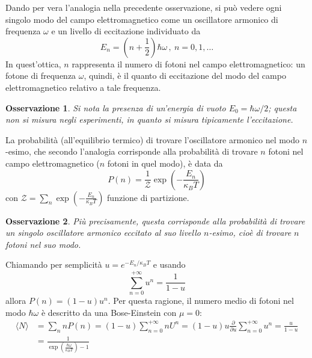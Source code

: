 \documentclass[11pt, a4paper]{scrartcl}
\theoremstyle{style}
\newtheorem{osservazione}{Osservazione}[section]
\numberwithin{equation}{subsection}
\begin{document}
\noindent Dando per vera l'analogia nella precedente osservazione, si pu\`o vedere ogni singolo modo del campo elettromagnetico come un oscillatore armonico di frequenza $ \omega$ e un livello di eccitazione individuato da 
\[
E_n = \left(n + \frac{1}{2}\right) \hbar \omega \, , \ n = 0,1 , \ldots
\] 
In quest'ottica, $n$ rappresenta il numero di fotoni nel campo elettromagnetico: un fotone di frequenza $\omega$, quindi, \`e il quanto di eccitazione del modo del campo elettromagnetico relativo a tale frequenza.
\begin{osservazione}
Si nota la presenza di un'energia di vuoto $E_0 = \hbar \omega / 2$; questa non si misura negli esperimenti, in quanto si misura tipicamente l'eccitazione.
\end{osservazione}
\noindent La probabilit\`a (all'equilibrio termico) di trovare l'oscillatore armonico nel modo $n$-esimo, che secondo l'analogia corrisponde alla probabilit\`a di trovare $n$ fotoni nel campo elettromagnetico ($n$ fotoni in quel modo), \`e data da
\begin{equation}
	P(n) = \frac{1}{\mathcal{Z} } \exp \left(- \frac{E_n}{\kappa _B T}\right) 
\end{equation}
con $\mathcal{Z} = \sum_{n}^{} \exp\left(- \frac{E_n}{\kappa _B T}\right) $ funzione di partizione.
\begin{osservazione}
Pi\`u precisamente, questa corrisponde alla probabilit\`a di trovare un singolo oscillatore armonico eccitato al suo livello $n$-esimo, cio\`e di trovare $n$ fotoni nel suo modo.
\end{osservazione}
\noindent Chiamando per semplicit\`a $u = e^{- E_n / \kappa _B T}$ e usando 
\[
\sum_{n=0}^{+\infty} u ^ n = \frac{1}{1 - u}
\] 
allora $P(n) = (1-u) u ^n$.
Per questa ragione, il numero medio di fotoni nel modo $\hbar \omega$ \`e descritto da una Bose-Einstein con $\mu  =0 $:
\begin{equation}
	\begin{split}
		\langle N \rangle &= \sum_{n}^{} n P(n) = (1-u ) \sum_{n=0}^{+\infty} n U^n = (1-u) u \frac{\partial }{\partial u} \sum_{n=0}^{+\infty} u^n = \frac{u}{1-u}\\
				  & = \frac{1}{\exp \left(\frac{\hbar \omega}{\kappa _B T}\right) - 1}
	\end{split}
\end{equation}
\end{document}
